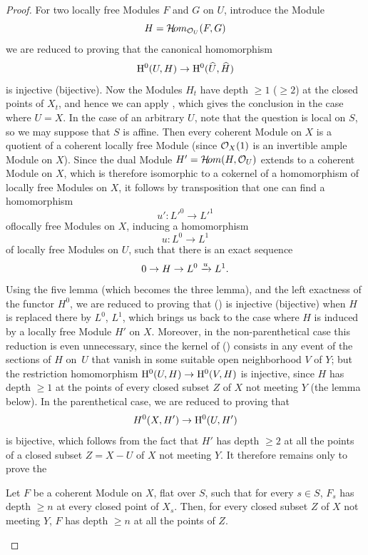 \begin{proof}
For two locally free Modules $F$ and $G$ on $U$, introduce the Module
\[
H=\mathcal H\!om_{\mathcal O_U}(F, G)
\]
we are reduced to proving that the canonical homomorphism
\steco
\begin{equation} \label{eq:XII.15} {}\mathrm H^0(U, H) \to \mathrm H^0(\widehat{U}, \widehat{H})
\end{equation}
is injective (\resp bijective). Now the Modules $H_t$ have depth $\geq 1$ (\resp $\geq 2$) at the closed points of $X_t$, and hence we can apply , which gives the conclusion  in the case where $U=X$. In the case of an arbitrary $U$, note that the question is local on $S$, so we may suppose that $S$ is affine. Then every coherent Module on $X$ is a quotient of a coherent locally free Module (since $\mathcal O_X(1)$ is an invertible  ample Module on $X$). Since the dual Module $H'=\mathcal H\!om(H, \mathcal O_U)$ extends to a coherent Module on $X$, which is therefore isomorphic to a cokernel of a homomorphism of locally free Modules on $X$, it follows by transposition that one can find a homomorphism
\[
u':{L'}^0 \to {L'}^1
\]
of\pageoriginale locally free Modules on $X$, inducing a homomorphism
\[
u:L^0 \to L^1
\]
of locally free Modules on $U$, such that there is an exact sequence
\[
0\to H \to L^0 \xrightarrow{u} L^1.
\]
Using the five lemma (which becomes the three lemma), and the left exactness of the functor $H^0$, we are reduced to proving that () is injective (\resp bijective) when $H$ is replaced there by $L^0$, $L^1$, which brings us back to the case where $H$ is induced by a locally free Module $H'$ on $X$. Moreover, in the non-parenthetical case this reduction is even unnecessary, since the kernel of () consists in any event of the sections of $H$ on~$U$ that vanish in some suitable open neighborhood $V$ of $Y$; but the restriction homomorphism $\mathrm H^0(U, H)\to\mathrm H^0(V, H)$ is injective, since $H$ has depth $\geq 1$ at the points of every closed subset $Z$ of $X$ not meeting $Y$ (\cf the lemma below). In the parenthetical case, we are reduced to proving that
\[
H^0(X, H')\to\mathrm H^0(U, H')
\]
is bijective, which follows from the fact that $H'$ has depth $\geq 2$ at all the points of a closed subset $Z=X- U$ of $X$ not meeting $Y$. It therefore remains only to prove the

\begin{lemme} \label{XII.2.5} Let $F$ be a coherent Module on $X$, flat over $S$, such that for every $s\in S$, $F_s$ has depth $\geq n$ at every closed point of $X_s$. Then, for every closed subset $Z$ of $X$ not meeting $Y$, $F$ has depth $\geq n$ at all the points of $Z$.
\end{lemme}


\end{proof}

